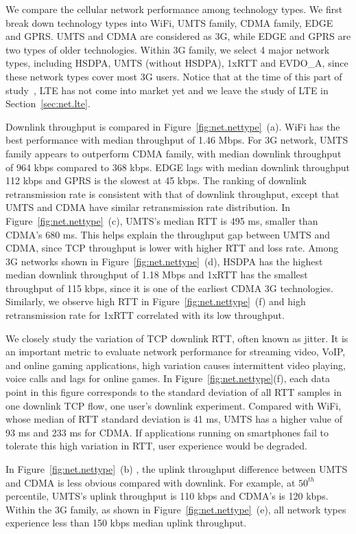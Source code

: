 We compare the cellular network performance among technology types. We first break down technology types into WiFi, UMTS family, CDMA family, EDGE and GPRS. UMTS and CDMA are considered as 3G, while EDGE and GPRS are two types of older technologies. 
Within 3G family, we select 4 major network types, including HSDPA, UMTS (without HSDPA), 1xRTT and EVDO\_A, since these network types cover most 3G users. Notice that at the time of this part of study~\cite{3gtest.tr}, LTE has not come into market yet and we leave the study of LTE in Section~\ref{sec:net.lte}.

Downlink throughput is compared in Figure~\ref{fig:net.nettype}~(a).
WiFi has the best performance with median throughput of 1.46 Mbps. For
3G network, UMTS family appears to outperform CDMA family, with median
downlink throughput of 964 kbps compared to 368 kbps. EDGE lags
with median downlink throughput 112 kbps and GPRS is the slowest at 45
kbps. The ranking of downlink retransmission rate is consistent with
that of downlink throughput, except that UMTS and CDMA have similar
retransmission rate distribution. In
Figure~\ref{fig:net.nettype}~(c), UMTS's median RTT is 495 ms,
smaller than CDMA's 680 ms. This helps explain the throughput gap
between UMTS and CDMA, since TCP throughput is lower with higher RTT
and loss rate. Among 3G networks shown in
Figure~\ref{fig:net.nettype}~(d), HSDPA has the highest median
downlink throughput of 1.18 Mbps and 1xRTT has the smallest throughput of 115 kbps, since it is one of the earliest CDMA 3G technologies. Similarly, we observe high RTT in Figure~\ref{fig:net.nettype}~(f) and high retransmission rate for 1xRTT correlated with its low throughput.

We closely study the variation of TCP downlink RTT, often known as jitter. It is an important metric to evaluate network performance for streaming video, VoIP, and online gaming applications, \eg high variation causes intermittent video playing, voice calls and lags for online games. In Figure~\ref{fig:net.nettype}(f), each data point in this figure corresponds to the standard deviation of all RTT samples in one downlink TCP flow, \ie one user's downlink experiment. Compared with WiFi, whose median of RTT standard deviation is 41 ms, UMTS has a higher value of 93 ms and 233 ms for CDMA. If applications running on smartphones fail to tolerate this high variation in RTT, user experience would be degraded.

In Figure~\ref{fig:net.nettype}~(b) , the uplink throughput difference between UMTS and CDMA is less obvious compared with downlink. For example, at $50^{th}$ percentile, UMTS's uplink throughput is 110 kbps and CDMA's is 120 kbps. Within the 3G family, as shown in Figure~\ref{fig:net.nettype}~(e), all network types experience less than 150 kbps median uplink throughput.

